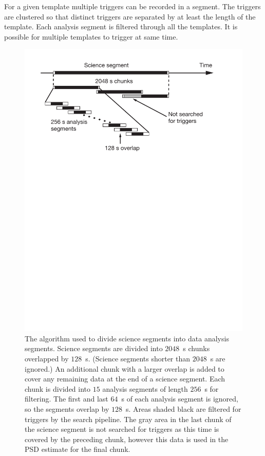 For a given template multiple triggers can be recorded in a segment.  The
triggers are clustered so that distinct triggers are separated by at least the
length of the template.  Each analysis segment is filtered through all the
templates. It is possible for multiple templates to trigger at same time.

\begin{figure}[htb]
\label{f:s2_segments}
\begin{center}
\includegraphics[width=\linewidth]{figures/pipeline/s2_segments}
\end{center}
\caption{%
The algorithm used to divide science segments into data analysis segments.
Science segments are divided into $2048$~s chunks overlapped by $128$~s.
(Science segments shorter than $2048$~s are ignored.) An additional chunk with
a larger overlap is added to cover any remaining data at the end of a science
segment.  Each chunk is divided into $15$ analysis segments of length $256$~s
for filtering. The first and last $64$~s of each analysis segment is ignored,
so the segments overlap by $128$~s.  Areas shaded black are filtered for
triggers by the search pipeline. The gray area in the last chunk of the
science segment is not searched for triggers as this time is covered by the
preceding chunk, however this data is used in the PSD estimate for the final
chunk.
}
\end{figure}

